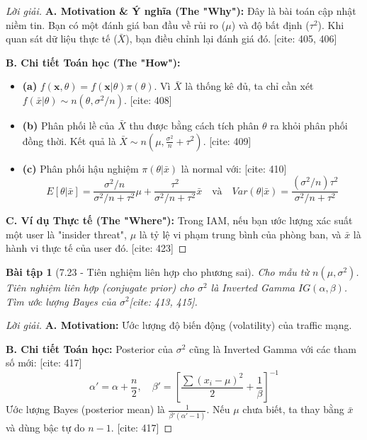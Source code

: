 \documentclass[8pt,a4paper]{article}
\newtheorem{exercise}{Bài tập}
\newenvironment{solution}{\begin{proof}[Lời giải]}{\end{proof}}
\begin{document}
\begin{solution}
\textbf{A. Motivation \& Ý nghĩa (The "Why"):} Đây là bài toán cập nhật niềm tin. Bạn có một đánh giá ban đầu về rủi ro ($\mu$) và độ bất định ($\tau^2$). Khi quan sát dữ liệu thực tế ($\bar{X}$), bạn điều chỉnh lại đánh giá đó. [cite: 405, 406]

\textbf{B. Chi tiết Toán học (The "How"):}
\begin{itemize}
    \item \textbf{(a)} $f(\mathbf{x}, \theta) = f(\mathbf{x}|\theta)\pi(\theta)$. Vì $\bar{X}$ là thống kê đủ, ta chỉ cần xét $f(\bar{x}|\theta) \sim n(\theta, \sigma^2/n)$. [cite: 408]
    \item \textbf{(b)} Phân phối lề của $\bar{X}$ thu được bằng cách tích phân $\theta$ ra khỏi phân phối đồng thời. Kết quả là $\bar{X} \sim n(\mu, \frac{\sigma^2}{n} + \tau^2)$. [cite: 409]
    \item \textbf{(c)} Phân phối hậu nghiệm $\pi(\theta|\bar{x})$ là normal với: [cite: 410]
    \[ E[\theta|\bar{x}] = \frac{\sigma^2/n}{\sigma^2/n + \tau^2}\mu + \frac{\tau^2}{\sigma^2/n + \tau^2}\bar{x} \quad \text{và} \quad Var(\theta|\bar{x}) = \frac{(\sigma^2/n)\tau^2}{\sigma^2/n + \tau^2} \]
\end{itemize}

\textbf{C. Ví dụ Thực tế (The "Where"):} Trong IAM, nếu bạn ước lượng xác suất một user là "insider threat", $\mu$ là tỷ lệ vi phạm trung bình của phòng ban, và $\bar{x}$ là hành vi thực tế của user đó. [cite: 423]
\end{solution}

\begin{exercise}[7.23 - Tiên nghiệm liên hợp cho phương sai]
Cho mẫu từ $n(\mu, \sigma^2)$. Tiên nghiệm liên hợp (conjugate prior) cho $\sigma^2$ là Inverted Gamma $IG(\alpha, \beta)$. Tìm ước lượng Bayes của $\sigma^2$[cite: 413, 415].
\end{exercise}

\begin{solution}
\textbf{A. Motivation:} Ước lượng độ biến động (volatility) của traffic mạng.

\textbf{B. Chi tiết Toán học:}
Posterior của $\sigma^2$ cũng là Inverted Gamma với các tham số mới: [cite: 417]
\[ \alpha' = \alpha + \frac{n}{2}, \quad \beta' = \left[ \frac{\sum (x_i-\mu)^2}{2} + \frac{1}{\beta} \right]^{-1} \]
Ước lượng Bayes (posterior mean) là $\frac{1}{\beta'(\alpha'-1)}$. Nếu $\mu$ chưa biết, ta thay bằng $\bar{x}$ và dùng bậc tự do $n-1$. [cite: 417]
\end{solution}
\end{document}
